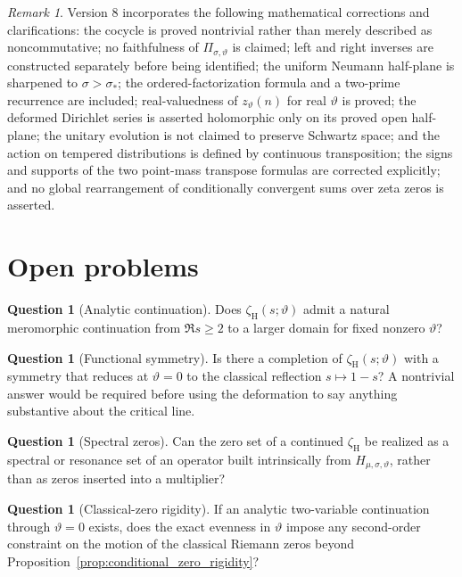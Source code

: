 \documentclass[11pt]{amsart}
\numberwithin{equation}{section}
\theoremstyle{plain}
\theoremstyle{definition}
\newtheorem{question}[theorem]{Question}
\theoremstyle{remark}
\newtheorem{remark}[theorem]{Remark}
\begin{document}
\begin{remark}
\label{rem:v2_audit_corrections}
Version 8 incorporates the following mathematical corrections and
clarifications: the cocycle is proved nontrivial rather than merely described
as noncommutative; no faithfulness of \(\Pi_{\sigma,\vartheta}\) is
claimed; left and right inverses are constructed separately before being
identified; the uniform Neumann half-plane is sharpened to
\(\sigma>\sigma_*\); the ordered-factorization formula and a two-prime
recurrence are included; real-valuedness of \(z_\vartheta(n)\) for real
\(\vartheta\) is proved; the deformed Dirichlet series is asserted
holomorphic only on its proved open half-plane; the unitary evolution is not
claimed to preserve Schwartz space; and the action on tempered distributions
is defined by continuous transposition; the signs and supports of the two point-mass transpose formulas are corrected explicitly; and no global rearrangement of conditionally convergent sums over zeta zeros is asserted.
\end{remark}

\section{Open problems}
\label{sec:open_problems}

\begin{question}[Analytic continuation]
\label{q:analytic_continuation}
Does $\zeta_{\mathrm H}(s;\vartheta)$ admit a natural meromorphic continuation
from $\Re s\ge2$ to a larger domain for fixed nonzero $\vartheta$?
\end{question}

\begin{question}[Functional symmetry]
\label{q:functional_symmetry}
Is there a completion of $\zeta_{\mathrm H}(s;\vartheta)$ with a symmetry
that reduces at $\vartheta=0$ to the classical reflection $s\mapsto1-s$?
A nontrivial answer would be required before using the deformation to say
anything substantive about the critical line.
\end{question}

\begin{question}[Spectral zeros]
\label{q:spectral_zeros}
Can the zero set of a continued $\zeta_{\mathrm H}$ be realized as a spectral
or resonance set of an operator built intrinsically from
$H_{\mu,\sigma,\vartheta}$, rather than as zeros inserted into a multiplier?
\end{question}

\begin{question}[Classical-zero rigidity]
\label{q:classical_zero_rigidity}
If an analytic two-variable continuation through $\vartheta=0$ exists, does
the exact evenness in $\vartheta$ impose any second-order constraint on the
motion of the classical Riemann zeros beyond
Proposition~\ref{prop:conditional_zero_rigidity}?
\end{question}
\end{document}
